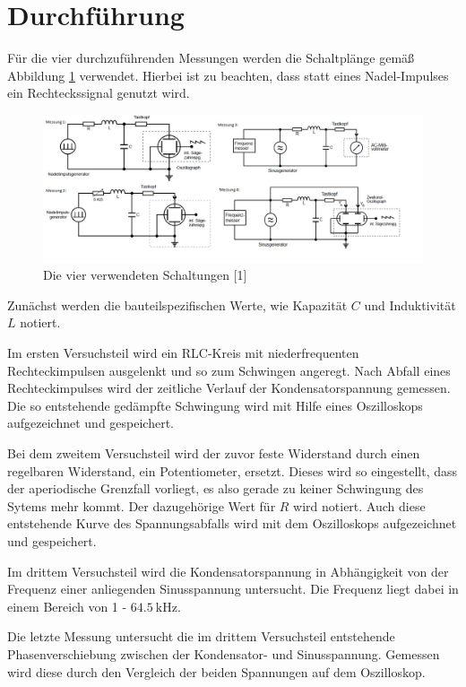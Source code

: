 \section{Durchführung}
\label{sec:Durchführung}

Für die vier durchzuführenden Messungen werden die Schaltplänge gemäß
Abbildung \ref{fig:Aufbau} verwendet. Hierbei ist zu beachten, dass statt eines 
Nadel-Impulses ein Rechteckssignal genutzt wird. 

\begin{figure}
  \centering
  \includegraphics[scale=0.4]{content/Aufbau_Schaltungen.jpg}
  \caption{Die vier verwendeten Schaltungen [1]}
  \label{fig:Aufbau}
\end{figure}

Zunächst werden die bauteilspezifischen Werte, wie Kapazität $C$
und Induktivität $L$ notiert. 

Im ersten Versuchsteil wird ein RLC-Kreis mit niederfrequenten 
Rechteckimpulsen ausgelenkt und so zum Schwingen angeregt. Nach Abfall
eines Rechteckimpulses wird der zeitliche Verlauf der Kondensatorspannung
gemessen. Die so entstehende gedämpfte Schwingung wird mit Hilfe eines
Oszilloskops aufgezeichnet und gespeichert. 

Bei dem zweitem Versuchsteil wird der zuvor feste Widerstand durch einen 
regelbaren Widerstand, ein Potentiometer, ersetzt. Dieses wird so eingestellt, 
dass der aperiodische Grenzfall vorliegt, es also gerade zu keiner Schwingung des 
Sytems mehr kommt. Der dazugehörige Wert für $R$ wird notiert. Auch diese 
entstehende Kurve des Spannungsabfalls wird mit dem Oszilloskops aufgezeichnet 
und gespeichert. 

Im drittem Versuchsteil wird die Kondensatorspannung in Abhängigkeit von 
der Frequenz einer anliegenden Sinusspannung untersucht. Die Frequenz
liegt dabei in einem Bereich von 1 - $\SI{64.5}{\kilo\hertz}$. 

Die letzte Messung untersucht die im drittem Versuchsteil entstehende 
Phasenverschiebung zwischen der Kondensator- und Sinusspannung. Gemessen 
wird diese durch den Vergleich der beiden Spannungen auf dem Oszilloskop. 


